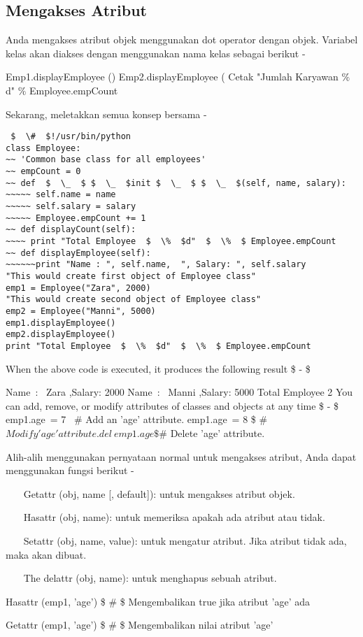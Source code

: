 \subsection{Mengakses Atribut}
Anda mengakses atribut objek menggunakan dot operator dengan objek. Variabel kelas akan diakses dengan menggunakan nama kelas sebagai berikut -

Emp1.displayEmployee ()
Emp2.displayEmployee (
Cetak "Jumlah Karyawan $  \%  $ d" $  \%  $ Employee.empCount

Sekarang, meletakkan semua konsep bersama -
\begin{verbatim}
 $  \#  $!/usr/bin/python
class Employee:
~~ 'Common base class for all employees'
~~ empCount = 0
~~ def  $  \_  $ $  \_  $init $  \_  $ $  \_  $(self, name, salary):
~~~~~ self.name = name
~~~~~ self.salary = salary
~~~~~ Employee.empCount += 1
~~ def displayCount(self):
~~~~ print "Total Employee  $  \%  $d"  $  \%  $ Employee.empCount
~~ def displayEmployee(self):
~~~~~~print "Name : ", self.name,  ", Salary: ", self.salary
"This would create first object of Employee class"
emp1 = Employee("Zara", 2000)
"This would create second object of Employee class"
emp2 = Employee("Manni", 5000)
emp1.displayEmployee()
emp2.displayEmployee()
print "Total Employee  $  \%  $d"  $  \%  $ Employee.empCount
\end{verbatim}
When the above code is executed, it produces the following result  \$ - \$

Name~:~ Zara ,Salary:  2000
Name~:~ Manni ,Salary:  5000
Total Employee 2
You can add, remove, or modify attributes of classes and objects at any time  \$ - \$
emp1.age~= 7  \ $  \#  $ Add an 'age' attribute.
emp1.age~= 8   \$  \#  $ Modify 'age' attribute.
del~emp1.age  \$  \#  $ Delete 'age' attribute.

Alih-alih menggunakan pernyataan normal untuk mengakses atribut, Anda dapat menggunakan fungsi berikut -

~~~ Getattr (obj, name [, default]): untuk mengakses atribut objek.

~~~ Hasattr (obj, name): untuk memeriksa apakah ada atribut atau tidak.


~~~ Setattr (obj, name, value): untuk mengatur atribut. Jika atribut tidak ada, maka akan dibuat.


~~~ The delattr (obj, name): untuk menghapus sebuah atribut.


Hasattr (emp1, 'age')  \$  \#  \$ Mengembalikan true jika atribut 'age' ada

Getattr (emp1, 'age')  \$  \#  \$ Mengembalikan nilai atribut 'age'


